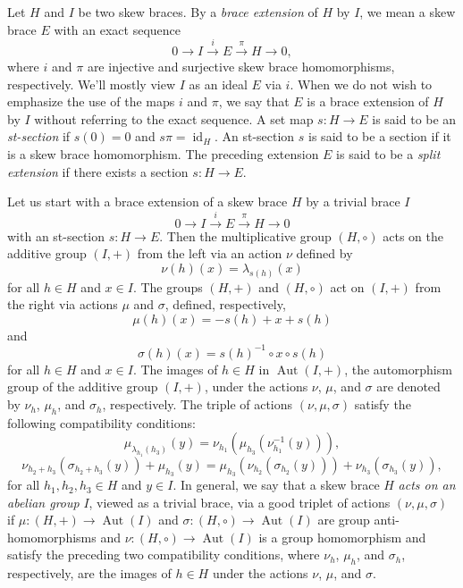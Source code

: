 \documentclass[11pt]{amsart}
\theoremstyle{thrm}
\theoremstyle{plain}
\theoremstyle{definition}
\newcommand{\Id}{\operatorname{id}}
\newcommand{\Aut}{\operatorname{Aut} }
\numberwithin{equation}{section}
\begin{document}
Let $H$ and $I$ be two skew braces. By a  \emph{ brace extension} of $H$ by $I$, we mean a skew brace $E$ with an exact sequence
\[
0 \longrightarrow I \xrightarrow{i} E \xrightarrow{\pi} H \longrightarrow 0,
\]
where $i$ and $\pi$ are injective and surjective skew brace homomorphisms, respectively.  We'll mostly view $I$  as an ideal $E$ via $i$. When we do not wish to emphasize the use of the maps $i$ and $\pi$,  we say that  $E$ is a brace extension of $H$ by $I$ without referring to the exact sequence.  A set map $s: H \to E$ is said to be an {\it st-section} if $s(0) = 0$ and $s \pi = \Id_H$.   An st-section $s$ is said to be a {section} if it is a skew brace homomorphism. The preceding extension $E$ is said to be a {\it split extension} if there exists a  section $s: H \to E$. 


Let us start with a brace extension of a skew brace $H$ by a trivial brace $I$
\[
0 \longrightarrow I \xrightarrow{i} E \xrightarrow{\pi} H \longrightarrow 0
\]
with  an st-section $s : H \to E$.  Then the multiplicative group $(H, \circ)$ acts on the additive group $(I, +)$ from the left via an action $\nu$ defined by 
$$\nu(h)(x) = \lambda_{s(h)}(x)$$
 for all $h \in H$ and $x \in I$. The groups $(H, +)$ and $(H, \circ)$ act  on $(I, +)$ from the right via actions $\mu$ and $\sigma$, defined, respectively,  
 $$\mu(h)(x) = -s(h) + x + s(h)$$
  and
  $$\sigma(h)(x) =  s(h)^{-1} \circ x\circ s(h)$$
  for all $h \in H$ and $x \in I$. The images of $h \in H$ in $\operatorname{Aut}(I, +)$, the automorphism group of the additive group $(I, +)$, under the actions $\nu$, $\mu$, and $\sigma$ are denoted by $\nu_h$, $\mu_h$, and $\sigma_h$, respectively. The triple of actions $(\nu, \mu, \sigma)$ satisfy the following compatibility conditions:
\[
\mu_{\lambda_{h_1}(h_3)}(y) = \nu_{h_1} ( \mu_{h_3} ( \nu_{h_1}^{-1}(y) )),
\]
\[
\nu_{h_2 + h_3} \left( \sigma_{h_2 + h_3}(y) \right) + \mu_{h_3}(y) = \mu_{h_3} \left( \nu_{h_2} \left( \sigma_{h_2}(y) \right) \right) + \nu_{h_3} \left( \sigma_{h_3}(y) \right),
\]
for all $h_1, h_2, h_3 \in H$ and $y \in I$. In general, we say that a skew brace $H$ {\it acts on an abelian group} $I$, viewed as a trivial brace, via a good triplet of actions $(\nu, \mu, \sigma)$ if $\mu:  (H, +) \to \Aut(I)$ and $\sigma: (H, \circ) \to  \Aut(I)$  are group anti-homomorphisms and $\nu: (H, \circ) \to \Aut(I)$ is a group homomorphism and satisfy the preceding two compatibility conditions, where $\nu_h$, $\mu_h$, and $\sigma_h$, respectively, are the images of $h \in H$ under the actions $\nu$, $\mu$, and $\sigma$.
\end{document}
